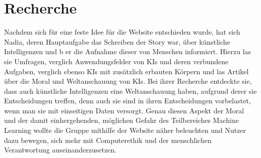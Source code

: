 \section{Recherche}
Nachdem sich für eine feste Idee für die Website entschieden wurde, hat sich Nadia, deren Hauptaufgabe das Schreiben der Story war, über künstliche Intelligenzen und b er die Aufnahme dieser von Menschen informiert. Hierzu las sie Umfragen, verglich Anwendungsfelder von KIs und deren verbundene Aufgaben, verglich ebenso KIs mit zusätzlich erbauten Körpern und las Artikel über die Moral und Weltanschauung von KIs.
Bei ihrer Recherche entdeckte sie, dass auch künstliche Intelligenzen eine Weltanschauung haben, aufgrund derer sie Entscheidungen treffen, denn auch sie sind in ihren Entscheidungen vorbelastet, wenn man sie mit einseitigen Daten versorgt. Genau diesen Aspekt der Moral und der damit einhergehenden, möglichen Gefahr des Teilbereiches Machine Learning wollte die Gruppe mithilfe der Website näher beleuchten und Nutzer dazu bewegen, sich mehr mit Computerethik und der menschlichen Verantwortung auseinanderzusetzen.